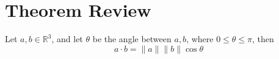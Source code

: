 \documentclass[openany]{book}
\newcommand{\R}{\mathbb{R}}
\begin{document}
































\newpage

\chapter{Theorem Review}
\begin{prop}\label{dot}
    Let $a,b\in\R^3$, and let $\theta$ be the angle between $a,b$, where $0\leq\theta\leq\pi$, then 
    \begin{equation*}
        a\cdot b=\|a\|\|b\|\cos\theta
    \end{equation*}
\end{prop}
\end{document}
